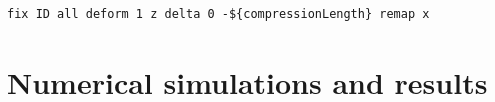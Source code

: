 \documentclass[twoside,english]{uiofysmaster}
\begin{document}
\begin{lstlisting}[caption={LAMMPS command for deforming the simulation box, and remaping atom positions.}, label={lst:Deform}, language=LammpsInput]
fix ID all deform 1 z delta 0 -${compressionLength} remap x
\end{lstlisting}
 

\part{Numerical simulations and results}
\end{document}
